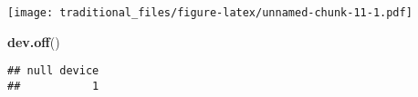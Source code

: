 \documentclass[]{article}
\newenvironment{Shaded}{\begin{snugshade}}{\end{snugshade}}
\newcommand{\KeywordTok}[1]{\textcolor[rgb]{0.13,0.29,0.53}{\textbf{#1}}}
\newcommand{\NormalTok}[1]{#1}
\begin{document}
\texttt{[image: traditional\_files/figure-latex/unnamed-chunk-11-1.pdf]}

\begin{Shaded}
\begin{Highlighting}[]
\KeywordTok{dev.off}\NormalTok{()}
\end{Highlighting}
\end{Shaded}

\begin{verbatim}
## null device 
##           1
\end{verbatim}
\end{document}
